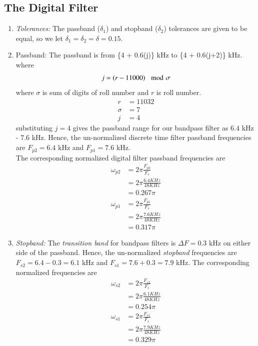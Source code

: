\documentclass{article}
\begin{document}
\subsection{The Digital Filter}
\begin{enumerate}
\item {\em Tolerances:}  The passband ($\delta_1$) and stopband ($\delta_2$) tolerances are given to
be equal, so we let $\delta_1 = \delta_2 = \delta = 0.15$.
\item {Passband:}
The passband is from \{4 + 0.6(j)\} kHz to \{4 + 0.6(j+2)\} kHz. \\
where 
\begin{align}
    j=\left(r-11000\right) \mod \sigma
\end{align}
where $\sigma$ is sum of digits of roll number and $r$ is roll number.\\
\begin{align}
    r&=11032\\
    \sigma  &= 7\\
    j&=4
\end{align}
 substituting $j =4$ gives the passband
range for our bandpass filter as $6.4$ kHz - $7.6$ kHz.  Hence, the un-normalized discrete time filter
passband frequencies are $F_{p2} = 6.4$ kHz
and $F_{p1} = 7.6$ kHz. \\
The corresponding normalized digital filter passband frequencies are
\begin{align}
    \omega_{p2} &= 2\pi\frac{F_{p2}}{F_s} \\
    &= 2\pi \frac{6.4 KHz}{48KHz}\\
    &= 0.267\pi\\
    \omega_{p1} &= 2\pi\frac{F_{p1}}{F_s}\\
    &= 2\pi\frac{7.6KHz}{48KHz}\\
    &= 0.317 \pi
\end{align}
\item {\em Stopband:}  The {\em transition band} for bandpass filters is $\Delta F = 0.3$ kHz on either side of the passband.
Hence, the un-normalized {\em stopband} frequencies are $F_{s2} = 6.4 - 0.3 = 6.1$ kHz and $F	_{s1} = 7.6 + 0.3 = 7.9$ kHz.  The corresponding normalized frequencies are 
\begin{align}
    \omega_{s2} &= 2\pi\frac{F_{s2}}{F_s} \\
    &= 2\pi \frac{6.1 KHz}{48KHz}\\
    &= 0.254\pi\\
    \omega_{s1} &= 2\pi\frac{F_{s1}}{F_s}\\
    &= 2\pi\frac{7.9KHz}{48KHz}\\
    &= 0.329 \pi
\end{align}
\end{enumerate}
\end{document}
